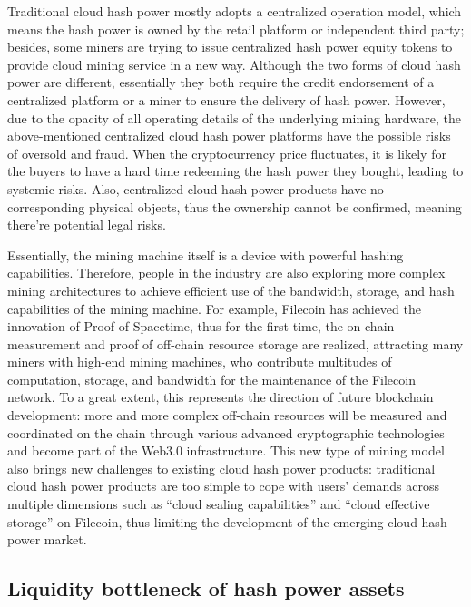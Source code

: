 \documentclass[]{template/llncs}
\begin{document}
Traditional cloud hash power mostly adopts a centralized operation model, which means the hash power is owned by the retail platform or independent third party; besides, some miners are trying to issue centralized hash power equity tokens to provide cloud mining service in a new way. Although the two forms of cloud hash power are different, essentially they both require the credit endorsement of a centralized platform or a miner to ensure the delivery of hash power. However, due to the opacity of all operating details of the underlying mining hardware, the above-mentioned centralized cloud hash power platforms have the possible risks of oversold and fraud. When the cryptocurrency price fluctuates, it is likely for the buyers to have a hard time redeeming the hash power they bought, leading to systemic risks. Also, centralized cloud hash power products have no corresponding physical objects, thus the ownership cannot be confirmed, meaning there're potential legal risks.

Essentially, the mining machine itself is a device with powerful hashing capabilities. Therefore, people in the industry are also exploring more complex mining architectures to achieve efficient use of the bandwidth, storage, and hash capabilities of the mining machine. For example, Filecoin has achieved the innovation of Proof-of-Spacetime, thus for the first time, the on-chain measurement and proof of off-chain resource storage are realized, attracting many miners with high-end mining machines, who contribute multitudes of computation, storage, and bandwidth for the maintenance of the Filecoin network. To a great extent, this represents the direction of future blockchain development: more and more complex off-chain resources will be measured and coordinated on the chain through various advanced cryptographic technologies and become part of the Web3.0 infrastructure. This new type of mining model also brings new challenges to existing cloud hash power products: traditional cloud hash power products are too simple to cope with users’ demands across multiple dimensions such as “cloud sealing capabilities” and “cloud effective storage” on Filecoin, thus limiting the development of the emerging cloud hash power market.

\subsection{Liquidity bottleneck of hash power assets}
\end{document}
